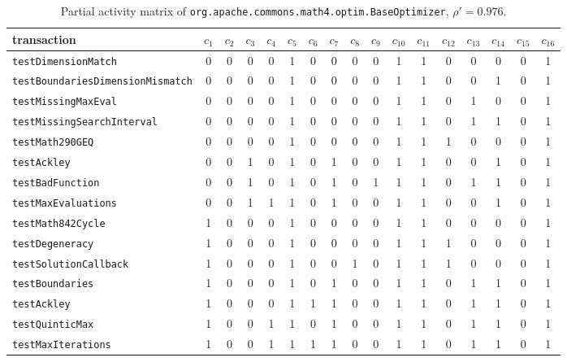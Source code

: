 \documentclass[twoside,a4paper,11pt]{memoir}
\begin{document}
\begin{table}[]
    \scriptsize
    \centering
    \caption{Partial activity matrix of \texttt{org.\-apache.\-commons.\-math4.\-optim.\-Base\-Optimizer}, \(\rho' = 0.976 \).}%
    \label{tab:baseoptimizer}
    \begin{adjustbox}{center}
    \begin{tabular}{l|cccccccccccccccc}
    transaction & \(c_1 \) & \(c_2 \) & \(c_3 \) & \(c_4 \) & \(c_5 \) & \(c_6 \) & \(c_7 \) & \(c_8 \) & \(c_9 \) & \(c_{10} \) & \(c_{11} \) & \(c_{12} \) & \(c_{13} \) & \(c_{14} \) & \(c_{15} \) & \(c_{16} \) \\ \hline
    \texttt{testDimensionMatch} & 0 & 0 & 0 & 0 & 1 & 0 & 0 & 0 & 0 & 1 & 1 & 0 & 0 & 0 & 0 & 1 \\
    \texttt{testBoundariesDimensionMismatch} & 0 & 0 & 0 & 0 & 1 & 0 & 0 & 0 & 0 & 1 & 1 & 0 & 0 & 1 & 0 & 1 \\
    \texttt{testMissingMaxEval} & 0 & 0 & 0 & 0 & 1 & 0 & 0 & 0 & 0 & 1 & 1 & 0 & 1 & 0 & 0 & 1 \\
    \texttt{testMissingSearchInterval} & 0 & 0 & 0 & 0 & 1 & 0 & 0 & 0 & 0 & 1 & 1 & 0 & 1 & 1 & 0 & 1 \\
    \texttt{testMath290GEQ} & 0 & 0 & 0 & 0 & 1 & 0 & 0 & 0 & 0 & 1 & 1 & 1 & 0 & 0 & 0 & 1 \\
    \texttt{testAckley} & 0 & 0 & 1 & 0 & 1 & 0 & 1 & 0 & 0 & 1 & 1 & 0 & 0 & 1 & 0 & 1 \\
    \texttt{testBadFunction} & 0 & 0 & 1 & 0 & 1 & 0 & 1 & 0 & 1 & 1 & 1 & 0 & 1 & 1 & 0 & 1 \\
    \texttt{testMaxEvaluations} & 0 & 0 & 1 & 1 & 1 & 0 & 1 & 0 & 0 & 1 & 1 & 0 & 0 & 1 & 0 & 1 \\
    \texttt{testMath842Cycle} & 1 & 0 & 0 & 0 & 1 & 0 & 0 & 0 & 0 & 1 & 1 & 0 & 0 & 0 & 0 & 1 \\
    \texttt{testDegeneracy} & 1 & 0 & 0 & 0 & 1 & 0 & 0 & 0 & 0 & 1 & 1 & 1 & 0 & 0 & 0 & 1 \\
    \texttt{testSolutionCallback} & 1 & 0 & 0 & 0 & 1 & 0 & 0 & 1 & 0 & 1 & 1 & 1 & 0 & 0 & 0 & 1 \\
    \texttt{testBoundaries} & 1 & 0 & 0 & 0 & 1 & 0 & 1 & 0 & 0 & 1 & 1 & 0 & 1 & 1 & 0 & 1 \\
    \texttt{testAckley} & 1 & 0 & 0 & 0 & 1 & 1 & 1 & 0 & 0 & 1 & 1 & 0 & 1 & 1 & 0 & 1 \\
    \texttt{testQuinticMax} & 1 & 0 & 0 & 1 & 1 & 0 & 1 & 0 & 0 & 1 & 1 & 0 & 1 & 1 & 0 & 1 \\
    \texttt{testMaxIterations} & 1 & 0 & 0 & 1 & 1 & 1 & 1 & 0 & 0 & 1 & 1 & 0 & 1 & 1 & 0 & 1 \\

\end{tabular}
\end{adjustbox}
\end{table}
\end{document}
